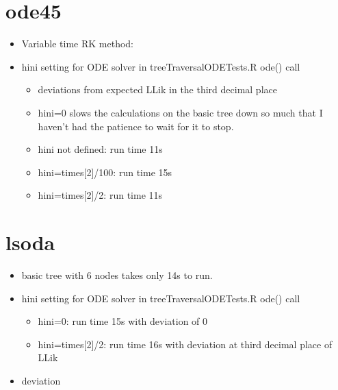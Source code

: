 \documentclass{article}
\begin{document}
\section*{ode45}
\begin{itemize}
\item Variable time RK method: 
\item hini setting for ODE solver in treeTraversalODETests.R ode() call
  \begin{itemize}
  \item deviations from expected LLik in the third decimal place
  \item  hini=0 slows the calculations on the basic tree down so much that I haven't had the patience to wait for it to stop.  
  \item hini not defined: run time 11s
  \item hini=times[2]/100: run time 15s
  \item hini=times[2]/2: run time 11s
  \end{itemize}

\end{itemize}

\section*{lsoda}
\begin{itemize}
\item basic tree with 6 nodes takes only 14s to run.
\item hini setting for ODE solver in treeTraversalODETests.R ode() call
  \begin{itemize}
  \item hini=0: run time 15s with deviation of 0
  \item hini=times[2]/2: run time 16s with deviation at third decimal place of LLik
  \end{itemize}
\item deviation 
\end{itemize}
\end{document}
